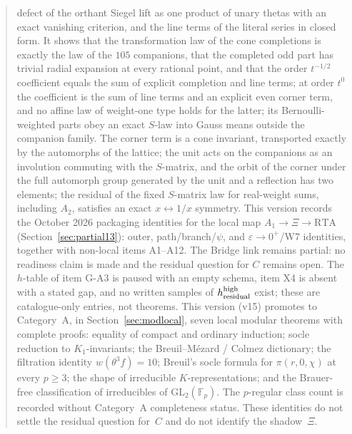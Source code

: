 \begin{abstract}
defect of the orthant Siegel lift as one product of unary thetas with an exact vanishing criterion, and the line terms of the literal series in closed form. It shows that the transformation law of the cone completions is exactly the law of the $105$ companions, that the completed odd part has trivial radial expansion at every rational point, and that the order $t^{-1/2}$ coefficient equals the sum of explicit completion and line terms; at order $t^0$ the coefficient is the sum of line terms and an explicit even corner term, and no affine law of weight-one type holds for the latter; its Bernoulli-weighted parts obey an exact $S$-law into Gauss means outside the companion family. The corner term is a cone invariant, transported exactly by the automorphs of the lattice; the unit acts on the companions as an involution commuting with the $S$-matrix, and the orbit of the corner under the full automorph group generated by the unit and a reflection has two elements; the residual of the fixed $S$-matrix law for real-weight sums, including $A_2$, satisfies an exact $x\leftrightarrow1/x$ symmetry.
This version records the October 2026 packaging identities for the local map $A_1\to\Xi\to\mathrm{RTA}$ (Section~\ref{sec:partial13}): outer, path/branch/$\psi$, and $\varepsilon\to0^+$/W7 identities, together with non-local items A1--A12. The Bridge link remains partial: no readiness claim is made and the residual question for $C$ remains open. The $h$-table of item G-A3 is paused with an empty schema, item X4 is absent with a stated gap, and no written samples of $h_{\rm residual}^{\rm high}$ exist; these are catalogue-only entries, not theorems.
This version (v15) promotes to Category~A, in Section~\ref{sec:modlocal}, seven local modular theorems with complete proofs: equality of compact and ordinary induction; socle reduction to $K_1$-invariants; the Breuil--M\'ezard / Colmez dictionary; the filtration identity $w(\theta^3 f)=10$; Breuil's socle formula for $\pi(r,0,\chi)$ at every $p\ge3$; the shape of irreducible $K$-representations; and the Brauer-free classification of irreducibles of $\mathrm{GL}_2(\mathbb{F}_p)$. The $p$-regular class count is recorded without Category~A completeness status. These identities do not settle the residual question for~$C$ and do not identify the shadow~$\Xi$.

\end{abstract}
